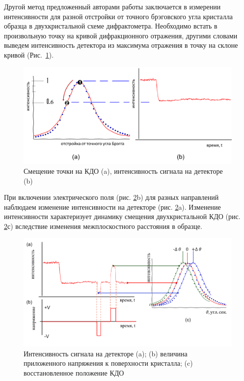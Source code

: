 \label{sec:slope_diff_piezo}
Другой метод предложенный авторами работы \cite{piezo50} заключается в измерении интенсивности для разной
отстройки от точного брэговского угла кристалла образца в двухкристальной схеме дифрактометра.
Необходимо  встать в произвольную точку на кривой дифракционного отражения,
другими словами выведем интенсивность детектора из максимума отражения в точку на склоне
 кривой (Рис.~\ref{ris:kdopiez}).

\begin{figure}[H]
\centering
\includegraphics[width=1\linewidth]{images/kdopiez2.png}
\caption{Смещение точки на КДО (a), интенсивность сигнала на детекторе (b)}
\label{ris:kdopiez}
\end{figure}

При включении электрического поля (рис. \ref{ris:princip}b) для разных направлений наблюдаем изменение интенсивности
на детекторе (рис. \ref{ris:princip}a). Изменение интенсивности характеризует динамику смещения
двухкристальной КДО (рис. \ref{ris:princip}с) вследствие изменения межплоскостного расстояния в образце.

\begin{figure}[H]
\centering
\includegraphics[width=0.8\linewidth]{images/princip2.png}
\caption{Интенсивность сигнала на детекторе (a); (b) величина  приложенного напряжения к
поверхности кристалла; (c) восстановленное положение КДО  }
\label{ris:princip}
\end{figure}

